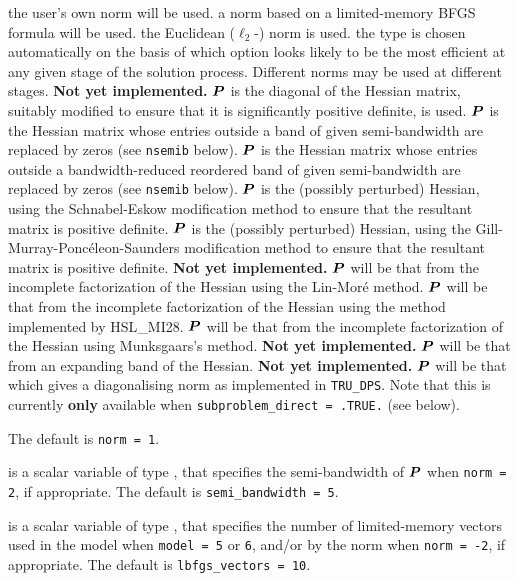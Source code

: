 \documentclass{galahad}
\newcommand{\packagename}{TRU}
\begin{document}
\begin{description}
\begin{description}
 the user's own norm will be used.
 a norm based on a limited-memory BFGS formula will be used.
 the Euclidean ($\ell_2$-) norm is used.
 the type is chosen automatically on the basis of which option looks
        likely to be the most efficient at any given stage of the solution
        process. Different norms may be used at different stages.
        {\bf Not yet implemented.}
 ${\bm{P}}$ is the diagonal of the Hessian matrix, suitably modified to
        ensure that it is significantly positive definite, is used.
 ${\bm{P}}$ is the Hessian matrix whose entries outside a band of
         given semi-bandwidth are replaced by zeros
        (see {\tt nsemib} below).
 ${\bm{P}}$ is the Hessian matrix whose entries outside a
        bandwidth-reduced reordered band of given semi-bandwidth are
        replaced by zeros (see {\tt nsemib} below).
 ${\bm{P}}$ is the (possibly perturbed) Hessian,
         using the Schnabel-Eskow modification
        method to ensure that the resultant matrix is positive definite.
 ${\bm{P}}$ is the (possibly perturbed) Hessian,
        using the Gill-Murray-Ponc\'{e}leon-Saunders
        modification method to ensure that the resultant matrix is
        positive definite.
        {\bf Not yet implemented.}
 ${\bm{P}}$ will be that from the incomplete factorization of the Hessian
        using the Lin-Mor\'{e} method.
 ${\bm{P}}$ will be that from the incomplete factorization of the Hessian
        using the method implemented by HSL\_MI28.
 ${\bm{P}}$ will be that from the incomplete factorization of the Hessian
        using Munksgaars's method. {\bf Not yet implemented.}
 ${\bm{P}}$ will be that from an expanding band of the Hessian.
        {\bf Not yet implemented.}
 ${\bm{P}}$ will be that which gives a diagonalising norm as implemented in
         {\tt \packagename\_DPS}.
          Note that this is currently {\bf only} available
         when {\tt subproblem\_direct = .TRUE.} (see below).
\end{description}
The default is {\tt norm = 1}.

 is a scalar variable of type \integer,
that specifies
the semi-bandwidth of ${\bm{P}}$ when {\tt norm = 2},
if appropriate.
The default is {\tt semi\_bandwidth = 5}.

 is a scalar variable of type \integer,
that specifies the number of limited-memory vectors used in the model
when {\tt model = 5} or {\tt 6},
and/or by the norm when {\tt norm = -2},
if appropriate.
The default is {\tt lbfgs\_vectors = 10}.


\end{description}
\end{document}

